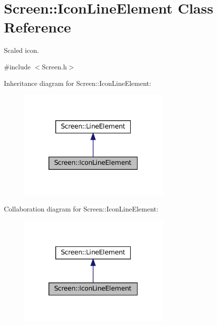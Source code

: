 \hypertarget{classScreen_1_1IconLineElement}{}\section{Screen\+:\+:Icon\+Line\+Element Class Reference}
\label{classScreen_1_1IconLineElement}


Scaled icon.  




{\ttfamily \#include $<$Screen.\+h$>$}



Inheritance diagram for Screen\+:\+:Icon\+Line\+Element\+:\nopagebreak
\begin{figure}[H]
\begin{center}
\leavevmode
\includegraphics[width=217pt]{classScreen_1_1IconLineElement__inherit__graph}
\end{center}
\end{figure}


Collaboration diagram for Screen\+:\+:Icon\+Line\+Element\+:\nopagebreak
\begin{figure}[H]
\begin{center}
\leavevmode
\includegraphics[width=217pt]{classScreen_1_1IconLineElement__coll__graph}
\end{center}
\end{figure}
